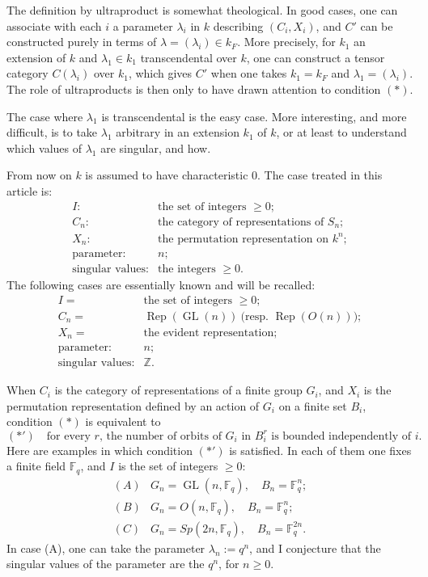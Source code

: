\documentclass[11pt]{article}
\newcommand{\Rep}{\operatorname{Rep}}
\newcommand{\GL}{\operatorname{GL}}
\newcommand{\Z}{\mathbb Z}
\theoremstyle{deligne}
\begin{document}
The definition by ultraproduct is somewhat theological. In good cases, one can associate with each \(i\) a parameter \(\lambda_i\) in \(k\) describing \((C_i,X_i)\), and \(C'\) can be constructed purely in terms of \(\lambda=(\lambda_i)\in k_F\). More precisely, for \(k_1\) an extension of \(k\) and \(\lambda_1\in k_1\) transcendental over \(k\), one can construct a tensor category \(C(\lambda_i)\) over \(k_1\), which gives \(C'\) when one takes \(k_1=k_F\) and \(\lambda_1=(\lambda_i)\). The role of ultraproducts is then only to have drawn attention to condition \((*)\).

The case where \(\lambda_1\) is transcendental is the easy case. More interesting, and more difficult, is to take \(\lambda_1\) arbitrary in an extension \(k_1\) of \(k\), or at least to understand which values of \(\lambda_1\) are singular, and how.

From now on \(k\) is assumed to have characteristic \(0\). The case treated in this article is:
\[
\begin{array}{rl}
I: & \text{the set of integers }\geq0;\\
C_n: & \text{the category of representations of }S_n;\\
X_n: & \text{the permutation representation on }k^n;\\
\text{parameter:} & n;\\
\text{singular values:} & \text{the integers }\geq0.
\end{array}
\]
The following cases are essentially known and will be recalled:
\[
\begin{array}{rl}
I=&\text{the set of integers }\geq0;\\
C_n=&\Rep(\GL(n))\ \text{(resp. }\Rep(O(n))\text{)};\\
X_n=&\text{the evident representation};\\
\text{parameter:}&n;\\
\text{singular values:}&\Z.
\end{array}
\]

When \(C_i\) is the category of representations of a finite group \(G_i\), and \(X_i\) is the permutation representation defined by an action of \(G_i\) on a finite set \(B_i\), condition \((*)\) is equivalent to
\[
  (*')\quad \text{for every \(r\), the number of orbits of \(G_i\) in \(B_i^r\) is bounded independently of \(i\).}
\]
Here are examples in which condition \((*')\) is satisfied. In each of them one fixes a finite field \(\mathbb F_q\), and \(I\) is the set of integers \(\geq0\):
\[
\begin{array}{ll}
(A)&G_n=\GL(n,\mathbb F_q),\quad B_n=\mathbb F_q^n;\\
(B)&G_n=O(n,\mathbb F_q),\quad B_n=\mathbb F_q^n;\\
(C)&G_n=Sp(2n,\mathbb F_q),\quad B_n=\mathbb F_q^{2n}.
\end{array}
\]
In case (A), one can take the parameter \(\lambda_n:=q^n\), and I conjecture that the singular values of the parameter are the \(q^n\), for \(n\geq0\).
\end{document}
